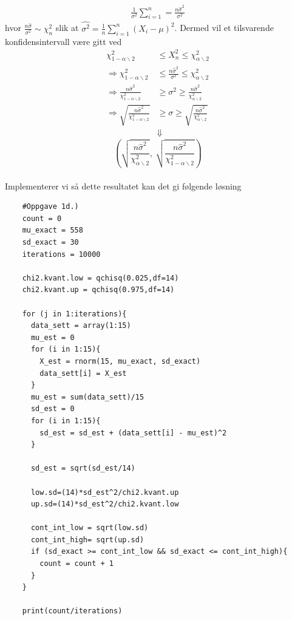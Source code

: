 \documentclass[12pt,
               a4paper,
               article,
               oneside,
               oldfontcommands,
               norsk]{memoir}
\begin{document}
\begin{align*}
  \frac{1}{\sigma^2}\sum_{i=1}^{n} = \frac{n \hat{\sigma}^2}{\sigma^2}
\end{align*} 
hvor $\frac{n \hat{\sigma}}{\sigma^2} \sim \chi^{2}_{n}$ slik at $\hat{\sigma^2} = \frac{1}{n} \sum_{i=1}^{n} \left( X_i - \mu \right)^2$. Dermed vil et tilsvarende konfidensintervall være gitt ved
\begin{align*}
  \chi^{2}_{1 - \alpha \backslash 2}   &\leq X^{2}_{n} \leq  \chi^{2}_{\alpha \backslash 2} \\[7pt] 
  \Rightarrow \chi^{2}_{1 - \alpha \backslash 2}  &\leq \frac{n \hat{\sigma}^2}{\sigma^2} \leq  \chi^{2}_{\alpha \backslash 2} \\[7pt]
  \Rightarrow \frac{n \hat{\sigma}^2}{\chi^{2}_{1 - \alpha \backslash 2}}  &\geq \sigma^2 \geq \frac{n \hat{\sigma}^2}{\chi^{2}_{\alpha \backslash 2}} \\[7pt]
  \Rightarrow \sqrt{\frac{n \hat{\sigma}^2}{\chi^{2}_{1 - \alpha \backslash 2}}}  &\geq \sigma \geq \sqrt{\frac{n \hat{\sigma}^2}{\chi^{2}_{\alpha \backslash 2}}}\\
  &\Downarrow
\end{align*}
  $$\boxed{\left(\sqrt{\frac{n \hat{\sigma}^2}{\chi^{2}_{\alpha \backslash 2}}}, \ \sqrt{\frac{n \hat{\sigma}^2}{\chi^{2}_{1 - \alpha \backslash 2}}}  \right)}$$ \\ 
  Implementerer vi så dette resultatet kan det gi følgende løsning
\begin{lstlisting}
    #Oppgave 1d.)
    count = 0
    mu_exact = 558
    sd_exact = 30
    iterations = 10000
    
    chi2.kvant.low = qchisq(0.025,df=14)
    chi2.kvant.up = qchisq(0.975,df=14)
    
    for (j in 1:iterations){
      data_sett = array(1:15)
      mu_est = 0
      for (i in 1:15){
        X_est = rnorm(15, mu_exact, sd_exact)
        data_sett[i] = X_est
      }
      mu_est = sum(data_sett)/15
      sd_est = 0
      for (i in 1:15){
        sd_est = sd_est + (data_sett[i] - mu_est)^2
      }
    
      sd_est = sqrt(sd_est/14)
    
      low.sd=(14)*sd_est^2/chi2.kvant.up
      up.sd=(14)*sd_est^2/chi2.kvant.low
    
      cont_int_low = sqrt(low.sd)
      cont_int_high= sqrt(up.sd)
      if (sd_exact >= cont_int_low && sd_exact <= cont_int_high){
        count = count + 1
      }
    }
    
    print(count/iterations)    
\end{lstlisting}
\end{document}

